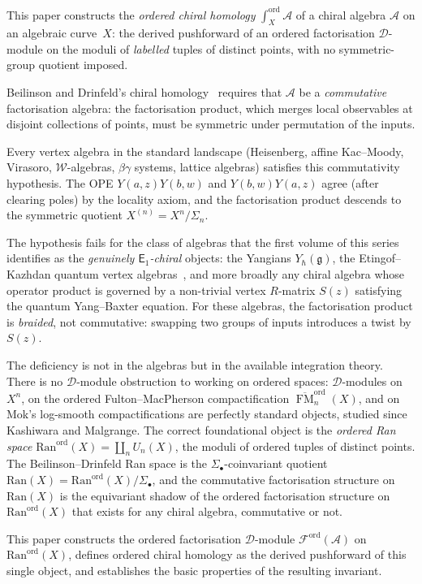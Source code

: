 \documentclass[11pt,reqno]{amsart}
\theoremstyle{definition}
\theoremstyle{remark}
\newcommand{\cA}{\mathcal{A}}
\newcommand{\cD}{\mathcal{D}}
\newcommand{\cF}{\mathcal{F}}
\newcommand{\cW}{\mathcal{W}}
\newcommand{\Ran}{\mathrm{Ran}}
\newcommand{\Eone}{\mathsf{E}_{1}}
\DeclareMathOperator{\FM}{FM}
\newcommand{\fg}{\mathfrak{g}}
\numberwithin{equation}{section}
\begin{document}
This paper constructs the \emph{ordered chiral homology}
$\int_X^{\mathrm{ord}} \cA$ of a chiral algebra $\cA$ on
an algebraic curve~$X$: the derived pushforward of an
ordered factorisation $\cD$-module on the moduli of
\emph{labelled} tuples of distinct points, with no
symmetric-group quotient imposed.

Beilinson and Drinfeld's chiral homology~\cite{BD04}
requires that $\cA$ be a \emph{commutative} factorisation
algebra: the factorisation product, which merges local
observables at disjoint collections of points, must be
symmetric under permutation of the inputs.

Every vertex algebra in the standard landscape (Heisenberg,
affine Kac--Moody, Virasoro, $\cW$-algebras, $\beta\gamma$
systems, lattice algebras) satisfies this commutativity
hypothesis. The OPE $Y(a,z)Y(b,w)$ and $Y(b,w)Y(a,z)$ agree
(after clearing poles) by the locality axiom, and the
factorisation product descends to the symmetric quotient
$X^{(n)} = X^n / \Sigma_n$.

The hypothesis fails for the class of algebras that the
first volume of this series~\cite{Lorgat26I} identifies as
the \emph{genuinely $\Eone$-chiral} objects: the Yangians
$Y_\hbar(\fg)$, the Etingof--Kazhdan quantum vertex
algebras~\cite{EK00}, and more broadly any chiral algebra
whose operator product is governed by a non-trivial
vertex $R$-matrix $S(z)$ satisfying the quantum Yang--Baxter
equation. For these algebras, the factorisation product is
\emph{braided}, not commutative: swapping two groups of
inputs introduces a twist by $S(z)$.

The deficiency is not in the algebras but in the available
integration theory. There is no $\cD$-module obstruction
to working on ordered spaces: $\cD$-modules on $X^n$, on
the ordered Fulton--MacPherson compactification
$\overline{\FM}_n^{\mathrm{ord}}(X)$, and on Mok's
log-smooth compactifications are perfectly standard objects,
studied since Kashiwara and Malgrange. The correct
foundational object is the \emph{ordered Ran space}
$\Ran^{\mathrm{ord}}(X) = \coprod_n U_n(X)$, the moduli of
ordered tuples of distinct points. The Beilinson--Drinfeld
Ran space is the $\Sigma_\bullet$-coinvariant quotient
$\Ran(X) = \Ran^{\mathrm{ord}}(X) / \Sigma_\bullet$, and
the commutative factorisation structure on $\Ran(X)$ is the
equivariant shadow of the ordered factorisation structure on
$\Ran^{\mathrm{ord}}(X)$ that exists for any chiral algebra,
commutative or not.

This paper constructs the ordered factorisation $\cD$-module
$\cF^{\mathrm{ord}}(\cA)$ on $\Ran^{\mathrm{ord}}(X)$, defines
ordered chiral homology as the derived pushforward of this
single object, and establishes the basic properties of the
resulting invariant.
\end{document}
